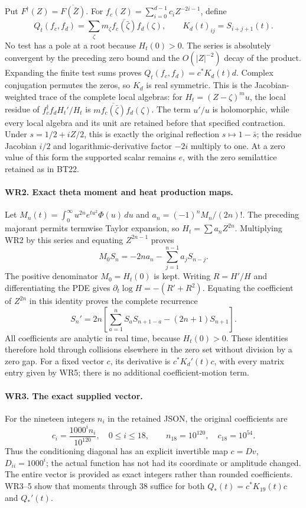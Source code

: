 Put $F^\dagger(Z)=\overline{F(\bar Z)}$. For
$f_c(Z)=\sum_{i=0}^{d-1}c_iZ^{-2i-1}$, define
\[
 Q_t(f_c,f_d)=\sum_\zeta m_\zeta
                \overline{f_c(\bar\zeta)}f_d(\zeta),\qquad
 K_d(t)_{ij}=S_{i+j+1}(t).
 \tag{WR3}
\]
No test has a pole at a root because $H_t(0)>0$.
The series is absolutely convergent by the preceding zero bound
and the $O(|Z|^{-2})$ decay of the product. Expanding the finite
test sums proves $Q_t(f_c,f_d)=c^*K_d(t)d$. Complex conjugation
permutes the zeros, so $K_d$ is real symmetric. This is the
Jacobian-weighted trace of the complete local algebras: for
$H_t=(Z-\zeta)^m u$, the local residue of
$f_c^\dagger f_d H_t'/H_t$ is
$m\overline{f_c(\bar\zeta)}f_d(\zeta)$. The term $u'/u$ is
holomorphic, while every local algebra and its unit are retained
before that specified contraction. Under $s=1/2+iZ/2$, this is
exactly the original reflection $s\mapsto1-\bar s$; the residue
Jacobian $i/2$ and logarithmic-derivative factor $-2i$ multiply to
one. At a zero value of this form the supported scalar remains
$e$, with the zero semilattice retained as in BT22.

\paragraph{WR2. Exact theta moment and heat production maps.}
Let $M_n(t)=\int_0^\infty u^{2n}e^{tu^2}\Phi(u)\,du$ and
$a_n=(-1)^nM_n/(2n)!$. The preceding majorant permits termwise
Taylor expansion, so $H_t=\sum a_nZ^{2n}$. Multiplying WR2 by
this series and equating $Z^{2n-1}$ proves
\[
 M_0S_n=-2n a_n-\sum_{j=1}^{n-1}a_jS_{n-j}.
 \tag{WR4}
\]
The positive denominator $M_0=H_t(0)$ is kept. Writing
$R=H'/H$ and differentiating the PDE gives
$\partial_t\log H=-(R'+R^2)$. Equating the coefficient of
$Z^{2n}$ in this identity proves the complete recurrence
\[
 S_n'=2n\left[\sum_{a=1}^nS_aS_{n+1-a}-(2n+1)S_{n+1}\right].
 \tag{WR5}
\]
All coefficients are analytic in real time, because $H_t(0)>0$.
These identities therefore hold through collisions elsewhere in
the zero set without division by a zero gap. For a fixed vector
$c$, its derivative is $c^*K_d'(t)c$, with every matrix entry
given by WR5; there is no additional coefficient-motion term.

\paragraph{WR3. The exact supplied vector.}
For the nineteen integers $n_i$ in the retained JSON, the original
coefficients are
\[
 c_i=\frac{1000^i n_i}{10^{120}},\quad0\le i\le18,
 \qquad n_{18}=10^{120},\quad c_{18}=10^{54}.
 \tag{WR6}
\]
Thus the conditioning diagonal has an explicit invertible map
$c=Dv$, $D_{ii}=1000^i$; the actual function has not had its
coordinate or amplitude changed. The entire vector is provided
as exact integers rather than rounded coefficients. WR3--5 show
that moments through $38$ suffice for both $Q_*(t)=c^*K_{19}(t)c$
and $Q_*'(t)$.

